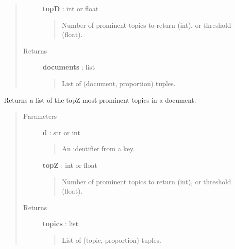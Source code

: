 \documentclass[letterpaper,10pt,english]{sphinxmanual}
\begin{document}
\begin{fulllineitems}
\begin{fulllineitems}
\begin{quote}
\begin{description}
\textbf{topD} : int or float
\begin{quote}

Number of prominent topics to return (int), or threshold (float).
\end{quote}

\item[{Returns }] \leavevmode
\textbf{documents} : list
\begin{quote}

List of (document, proportion) tuples.
\end{quote}

\end{description}\end{quote}

\end{fulllineitems}


\begin{fulllineitems}
\label{tethne:tethne.data.LDAModel.topics_in_doc}
Returns a list of the topZ most prominent topics in a document.
\begin{quote}\begin{description}
\item[{Parameters }] \leavevmode
\textbf{d} : str or int
\begin{quote}

An identifier from a {\hyperref[tethne:tethne.data.Paper]{}} key.
\end{quote}

\textbf{topZ} : int or float
\begin{quote}

Number of prominent topics to return (int), or threshold (float).
\end{quote}

\item[{Returns }] \leavevmode
\textbf{topics} : list
\begin{quote}

List of (topic, proportion) tuples.
\end{quote}

\end{description}\end{quote}

\end{fulllineitems}


\end{fulllineitems}
\end{document}
